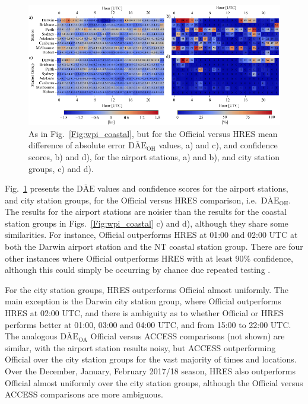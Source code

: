 \documentclass[twocol]{ametsoc}
\begin{document}
\begin{figure}
\centering
\includegraphics[width=39pc]{airport_wpi.pdf}
\caption{As in Fig.~\ref{Fig:wpi_coastal}, but for the Official versus HRES mean difference of absolute error $\overline{\text{DAE}}_\text{OH}$ values, a) and c), and confidence scores, b) and d), for the airport stations, a) and b), and city station groups, c) and d).}
\label{Fig:airport_wpi}
\end{figure}

Fig.~\ref{Fig:airport_wpi} presents the $\overline{\text{DAE}}$ values and confidence scores for the airport stations, and city station groups, for the Official versus HRES comparison, i.e.~$\overline{\text{DAE}}_\text{OH}$. The results for the airport stations are noisier than the results for the coastal station groups in Figs.~\ref{Fig:wpi_coastal} c) and d), although they share some similarities. For instance, Official outperforms HRES at 01:00 and 02:00 UTC at both the Darwin airport station and the NT coastal station group. There are four other instances where Official outperforms HRES with at least $90\%$ confidence, although this could simply be occurring by chance due repeated testing \citep[p. 178]{wilks11}.

For the city station groups, HRES outperforms Official almost uniformly. The main exception is the Darwin city station group, where Official outperforms HRES at 02:00 UTC, and there is ambiguity as to whether Official or HRES performs better at 01:00, 03:00 and 04:00 UTC, and from 15:00 to 22:00 UTC. The analogous $\overline{\text{DAE}}_\text{OA}$ Official versus ACCESS comparisons (not shown) are similar, with the airport station results noisy, but ACCESS outperforming Official over the city station groups for the vast majority of times and locations. Over the December, January, February 2017/18 season, HRES also outperforms Official almost uniformly over the city station groups, although the Official versus ACCESS comparisons are more ambiguous. 
\end{document}
